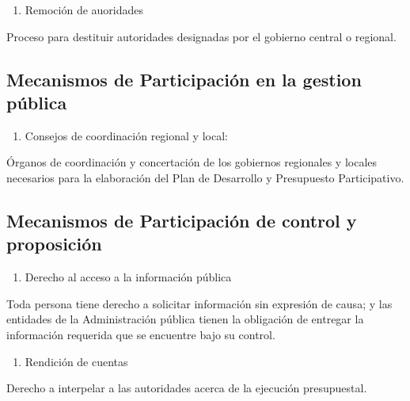 \documentclass[
]{book}
\providecommand{\tightlist}{%
  \setlength{\itemsep}{0pt}\setlength{\parskip}{0pt}}
\begin{document}
\begin{enumerate}
\def\labelenumi{\arabic{enumi}.}
\setcounter{enumi}{2}
\tightlist
\item
  Remoción de auoridades
\end{enumerate}

Proceso para destituir autoridades designadas por el gobierno central o regional.

\hypertarget{mecanismos-de-participaciuxf3n-en-la-gestion-puxfablica}{%
\subsection{Mecanismos de Participación en la gestion pública}\label{mecanismos-de-participaciuxf3n-en-la-gestion-puxfablica}}

\begin{enumerate}
\def\labelenumi{\arabic{enumi}.}
\tightlist
\item
  Consejos de coordinación regional y local:
\end{enumerate}

Órganos de coordinación y concertación de los gobiernos regionales y locales necesarios para la elaboración del Plan de Desarrollo y Presupuesto Participativo.

\hypertarget{mecanismos-de-participaciuxf3n-de-control-y-proposiciuxf3n}{%
\subsection{Mecanismos de Participación de control y proposición}\label{mecanismos-de-participaciuxf3n-de-control-y-proposiciuxf3n}}

\begin{enumerate}
\def\labelenumi{\arabic{enumi}.}
\tightlist
\item
  Derecho al acceso a la información pública
\end{enumerate}

Toda persona tiene derecho a solicitar información sin expresión de causa; y las entidades de la Administración pública tienen la obligación de entregar la información requerida que se encuentre bajo su control.

\begin{enumerate}
\def\labelenumi{\arabic{enumi}.}
\setcounter{enumi}{1}
\tightlist
\item
  Rendición de cuentas
\end{enumerate}

Derecho a interpelar a las autoridades acerca de la ejecución presupuestal.
\end{document}

